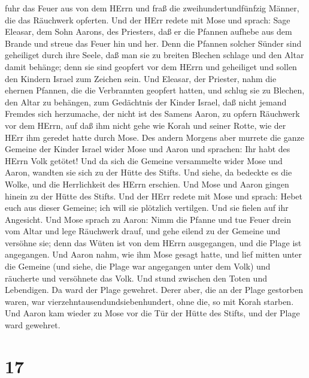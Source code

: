 fuhr das Feuer aus von dem HErrn und fraß die zweihundertundfünfzig
Männer, die das Räuchwerk opferten.  Und der HErr redete
mit Mose und sprach:  Sage Eleasar, dem Sohn Aarons, des
Priesters, daß er die Pfannen aufhebe aus dem Brande und streue das
Feuer hin und her.  Denn die Pfannen solcher Sünder sind
geheiliget durch ihre Seele, daß man sie zu breiten Blechen schlage und
den Altar damit behänge; denn sie sind geopfert vor dem HErrn und
geheiliget und sollen den Kindern Israel zum Zeichen sein. 
Und Eleasar, der Priester, nahm die ehernen Pfannen, die die Verbrannten
geopfert hatten, und schlug sie zu Blechen, den Altar zu behängen,
 zum Gedächtnis der Kinder Israel, daß nicht jemand Fremdes
sich herzumache, der nicht ist des Samens Aaron, zu opfern Räuchwerk vor
dem HErrn, auf daß ihm nicht gehe wie Korah und seiner Rotte, wie der
HErr ihm geredet hatte durch Mose.  Des andern Morgens aber
murrete die ganze Gemeine der Kinder Israel wider Mose und Aaron und
sprachen: Ihr habt des HErrn Volk getötet!  Und da sich die
Gemeine versammelte wider Mose und Aaron, wandten sie sich zu der Hütte
des Stifts. Und siehe, da bedeckte es die Wolke, und die Herrlichkeit
des HErrn erschien.  Und Mose und Aaron gingen hinein zu
der Hütte des Stifts.  Und der HErr redete mit Mose und
sprach:  Hebet euch aus dieser Gemeine; ich will sie
plötzlich vertilgen. Und sie fielen auf ihr Angesicht.  Und
Mose sprach zu Aaron: Nimm die Pfanne und tue Feuer drein vom Altar und
lege Räuchwerk drauf, und gehe eilend zu der Gemeine und versöhne sie;
denn das Wüten ist von dem HErrn ausgegangen, und die Plage ist
angegangen.  Und Aaron nahm, wie ihm Mose gesagt hatte, und
lief mitten unter die Gemeine (und siehe, die Plage war angegangen unter
dem Volk) und räucherte und versöhnete das Volk.  Und stund
zwischen den Toten und Lebendigen. Da ward der Plage gewehret.
 Derer aber, die an der Plage gestorben waren, war
vierzehntausendundsiebenhundert, ohne die, so mit Korah starben.
 Und Aaron kam wieder zu Mose vor die Tür der Hütte des
Stifts, und der Plage ward gewehret.

\hypertarget{section-16}{%
\section{17}\label{section-16}}

